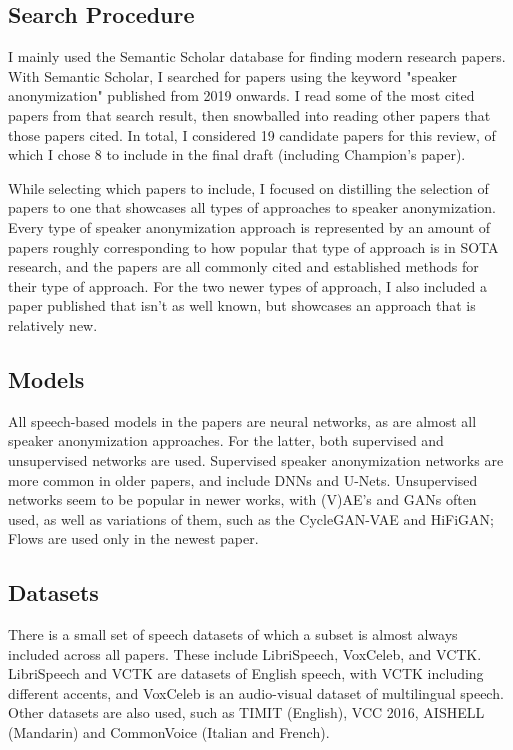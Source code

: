 \documentclass{Interspeech2024}
\begin{document}
\subsection{Search Procedure}
I mainly used the Semantic Scholar database for finding modern research papers.
With Semantic Scholar, I searched for papers using the keyword "speaker anonymization" published from 2019 onwards.
I read some of the most cited papers from that search result, then snowballed into reading other papers that those papers cited.
In total, I considered 19 candidate papers for this review, of which I chose 8 to include in the final draft (including Champion's \cite{champion_2023_thesis} paper).

While selecting which papers to include, I focused on distilling the selection of papers to one that showcases all types of approaches to speaker anonymization.
Every type of speaker anonymization approach is represented by an amount of papers roughly corresponding to how popular that type of approach is in SOTA research, and the papers are all commonly cited and established methods for their type of approach.
For the two newer types of approach, I also included a paper published that isn't as well known, but showcases an approach that is relatively new.

\subsection{Models}
All speech-based models in the papers are neural networks, as are almost all speaker anonymization approaches.
For the latter, both supervised and unsupervised networks are used.
Supervised speaker anonymization networks are more common in older papers, and include DNNs and U-Nets.
Unsupervised networks seem to be popular in newer works, with (V)AE's and GANs often used, as well as variations of them, such as the CycleGAN-VAE and HiFiGAN; Flows are used only in the newest paper.

\subsection{Datasets}
There is a small set of speech datasets of which a subset is almost always included across all papers.
These include LibriSpeech, VoxCeleb, and VCTK.
LibriSpeech and VCTK are datasets of English speech, with VCTK including different accents, and VoxCeleb is an audio-visual dataset of multilingual speech.
Other datasets are also used, such as TIMIT (English), VCC 2016, AISHELL (Mandarin) and CommonVoice (Italian and French).
\end{document}
